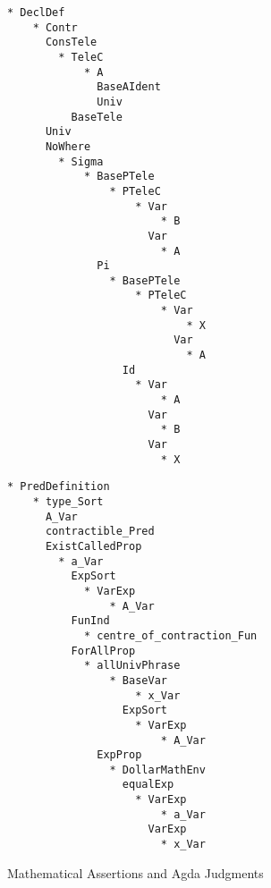 \begin{figure}[H]
\centering
\begin{minipage}[t]{.5\textwidth}
\begin{verbatim}
* DeclDef
    * Contr
      ConsTele
        * TeleC
            * A
              BaseAIdent
              Univ
          BaseTele
      Univ
      NoWhere
        * Sigma
            * BasePTele
                * PTeleC
                    * Var
                        * B
                      Var
                        * A
              Pi
                * BasePTele
                    * PTeleC
                        * Var
                            * X
                          Var
                            * A
                  Id
                    * Var
                        * A
                      Var
                        * B
                      Var
                        * X
\end{verbatim}
\end{minipage}%
\begin{minipage}[t]{.55\textwidth}
\begin{verbatim}
* PredDefinition
    * type_Sort
      A_Var
      contractible_Pred
      ExistCalledProp
        * a_Var
          ExpSort
            * VarExp
                * A_Var
          FunInd
            * centre_of_contraction_Fun
          ForAllProp
            * allUnivPhrase
                * BaseVar
                    * x_Var
                  ExpSort
                    * VarExp
                        * A_Var
              ExpProp
                * DollarMathEnv
                  equalExp
                    * VarExp
                        * a_Var
                      VarExp
                        * x_Var
\end{verbatim}
\end{minipage}
\caption{Mathematical Assertions and Agda Judgments} \label{fig:I2}
\end{figure}
